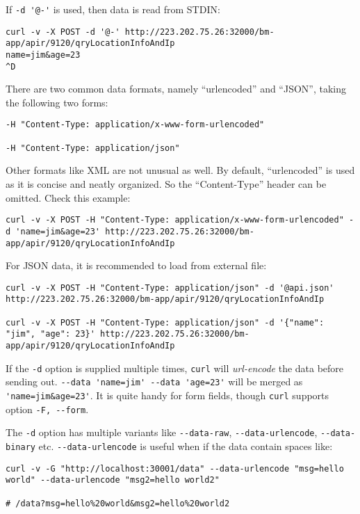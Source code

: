 If \lstinline|-d '@-'| is used, then data is read from STDIN:

\begin{lstlisting}
curl -v -X POST -d '@-' http://223.202.75.26:32000/bm-app/apir/9120/qryLocationInfoAndIp
name=jim&age=23
^D
\end{lstlisting}

There are two common data formats, namely ``urlencoded'' and
``JSON'', taking the following two forms:

\begin{lstlisting}
-H "Content-Type: application/x-www-form-urlencoded"

-H "Content-Type: application/json"
\end{lstlisting}

Other formats like XML are not unusual as well. By default,
``urlencoded'' is used as it is concise and neatly organized. So
the ``Content-Type'' header can be omitted. Check this example:

\begin{lstlisting}
curl -v -X POST -H "Content-Type: application/x-www-form-urlencoded" -d 'name=jim&age=23' http://223.202.75.26:32000/bm-app/apir/9120/qryLocationInfoAndIp
\end{lstlisting}

For JSON data, it is recommended to load from external file:

\begin{lstlisting}
curl -v -X POST -H "Content-Type: application/json" -d '@api.json' http://223.202.75.26:32000/bm-app/apir/9120/qryLocationInfoAndIp

curl -v -X POST -H "Content-Type: application/json" -d '{"name": "jim", "age": 23}' http://223.202.75.26:32000/bm-app/apir/9120/qryLocationInfoAndIp
\end{lstlisting}

If the \lstinline|-d| option is supplied multiple times,
\lstinline|curl| will \textit{url-encode} the data before sending
out. \lstinline|--data 'name=jim' --data 'age=23'| will be merged
as \lstinline|'name=jim&age=23'|. It is quite handy for form
fields, though \lstinline|curl| supports option
\lstinline|-F, --form|.

The \lstinline|-d| option has multiple variants like
\lstinline|--data-raw|, \lstinline|--data-urlencode|,
\lstinline|--data-binary| etc. \lstinline|--data-urlencode| is
useful when if the data contain spaces like:

\begin{lstlisting}
curl -v -G "http://localhost:30001/data" --data-urlencode "msg=hello world" --data-urlencode "msg2=hello world2"

# /data?msg=hello%20world&msg2=hello%20world2
\end{lstlisting}

